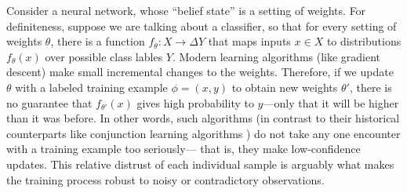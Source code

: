 \begin{example}\label{ex:classifier}
Consider a neural network, whose ``belief state'' is a setting of weights.
For definiteness, suppose we are talking about a classifier, so that for every setting of weights $\theta$, there is a function
$f_\theta : X \to \Delta Y$ that maps inputs $x \in X$ to distributions $f_\theta(x)$ over possible class lables $Y$. 
Modern learning algorithms (like gradient descent) make small incremental changes to the weights.
Therefore, if we update $\theta$ with a labeled training example $\phi = (x,y)$ to obtain new weights $\theta'$, there is no guarantee that $f_{\theta'}(x)$ gives high probability to $y$---only that it will be higher than it was before.
In other words, such algorithms 
(in contrast to their historical counterparts like conjunction learning algorithms \parencite{conjunctions}) 
do not take any one encounter with a training example too seriously---
\unskip that is, they make low-confidence updates. 
This relative distrust of each individual sample is arguably what makes the training process robust to noisy or contradictory observations.


\end{example}
